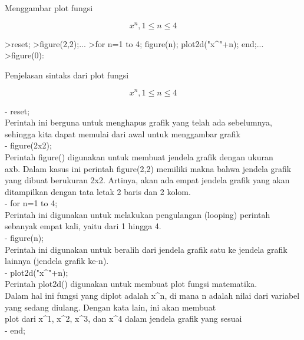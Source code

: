 \documentclass[a4paper,10pt]{article}
\begin{document}
\begin{eulernotebook}
\begin{eulercomment}
\begin{eulercomment}
\begin{eulercomment}
\begin{eulercomment}
\begin{eulercomment}
\begin{eulercomment}
\begin{eulercomment}
Menggambar plot fungsi\\
\end{eulercomment}
\begin{eulerformula}
\[
x^n, 1 \leq n \leq 4
\]
\end{eulerformula}
\begin{eulerprompt}
>reset;
>figure(2,2);...
>for n=1 to 4; figure(n); plot2d("x^"+n); end;...
>figure(0):
\end{eulerprompt}
\begin{eulercomment}
Penjelasan sintaks dari plot fungsi

\end{eulercomment}
\begin{eulerformula}
\[
x^n,  1 \leq n \leq 4
\]
\end{eulerformula}
\begin{eulercomment}
- reset;\\
Perintah ini berguna untuk menghapus grafik yang telah ada sebelumnya,
sehingga kita dapat memulai dari awal untuk menggambar grafik\\
- figure(2x2);\\
Perintah figure() digunakan untuk membuat jendela grafik dengan ukuran\\
axb. Dalam kasus ini perintah figure(2,2) memiliki makna bahwa jendela
grafik yang dibuat berukuran 2x2. Artinya, akan ada empat jendela
grafik yang akan ditampilkan dengan tata letak 2 baris dan 2 kolom.\\
- for n=1 to 4;\\
Perintah ini digunakan untuk melakukan pengulangan (looping) perintah
sebanyak empat kali, yaitu dari 1 hingga 4.\\
- figure(n);\\
Perintah ini digunakan untuk beralih dari jendela grafik satu ke
jendela grafik lainnya (jendela grafik ke-n).\\
- plot2d("x\textasciicircum{}"+n);\\
Perintah plot2d() digunakan untuk membuat plot fungsi matematika.\\
Dalam hal ini fungsi yang diplot adalah x\textasciicircum{}n, di mana n adalah nilai
dari variabel yang sedang diulang. Dengan kata lain, ini akan membuat\\
plot dari x\textasciicircum{}1, x\textasciicircum{}2, x\textasciicircum{}3, dan x\textasciicircum{}4 dalam jendela grafik yang sesuai\\
- end;\\

\end{eulercomment}
\end{eulercomment}
\end{eulercomment}
\end{eulercomment}
\end{eulercomment}
\end{eulercomment}
\end{eulercomment}
\end{eulernotebook}
\end{document}
